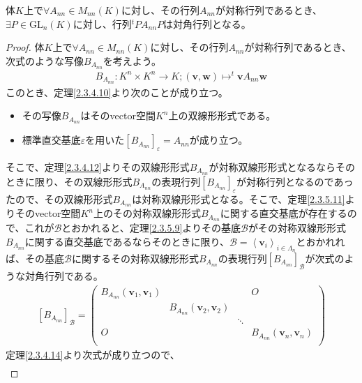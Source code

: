\documentclass[dvipdfmx]{jsarticle}
\begin{document}
\begin{thm}\label{2.3.5.13}
体$K$上で$\forall A_{nn} \in M_{nn}(K)$に対し、その行列$A_{nn}$が対称行列であるとき、$\exists P \in {\mathrm{GL}}_{n}(K)$に対し、行列$^{t}PA_{nn}P$は対角行列となる。
\end{thm}
\begin{proof}
体$K$上で$\forall A_{nn} \in M_{nn}(K)$に対し、その行列$A_{nn}$が対称行列であるとき、次式のような写像$B_{A_{nn}}$を考えよう。
\begin{align*}
B_{A_{nn}}:K^{n} \times K^{n} \rightarrow K;\left( \mathbf{v},\mathbf{w} \right) \mapsto^{t}\mathbf{v}A_{nn}\mathbf{w}
\end{align*}
このとき、定理\ref{2.3.4.10}より次のことが成り立つ。
\begin{itemize}
\item
  その写像$B_{A_{nn}}$はそのvector空間$K^{n}$上の双線形形式である。
\item
  標準直交基底$\varepsilon$を用いた$\left[ B_{A_{nn}} \right]_{\varepsilon} = A_{nn}$が成り立つ。
\end{itemize}
そこで、定理\ref{2.3.4.12}よりその双線形形式$B_{A_{nn}}$が対称双線形形式となるならそのときに限り、その双線形形式$B_{A_{nn}}$の表現行列$\left[ B_{A_{nn}} \right]_{\varepsilon}$が対称行列となるのであったので、その双線形形式$B_{A_{nn}}$は対称双線形形式となる。そこで、定理\ref{2.3.5.11}よりそのvector空間$K^{n}$上のその対称双線形形式$B_{A_{nn}}$に関する直交基底が存在するので、これが$\mathcal{B}$とおかれると、定理\ref{2.3.5.9}よりその基底$\mathcal{B}$がその対称双線形形式$B_{A_{nn}}$に関する直交基底であるならそのときに限り、$\mathcal{B} =\left\langle \mathbf{v}_{i} \right\rangle_{i \in \varLambda_{n}}$とおかれれば、その基底$\mathcal{B}$に関するその対称双線形形式$B_{A_{nn}}$の表現行列$\left[ B_{A_{nn}} \right]_{\mathcal{B}}$が次式のような対角行列である。
\begin{align*}
\left[ B_{A_{nn}} \right]_{\mathcal{B}} = \begin{pmatrix}
B_{A_{nn}}\left( \mathbf{v}_{1},\mathbf{v}_{1} \right) & \  & \  & O \\
\  & B_{A_{nn}}\left( \mathbf{v}_{2},\mathbf{v}_{2} \right) & \  & \  \\
\  & \  & \ddots & \  \\
O & \  & \  & B_{A_{nn}}\left( \mathbf{v}_{n},\mathbf{v}_{n} \right) \\
\end{pmatrix}
\end{align*}
定理\ref{2.3.4.14}より次式が成り立つので、
\begin{align*}

\end{align*}
\end{proof}
\end{document}
